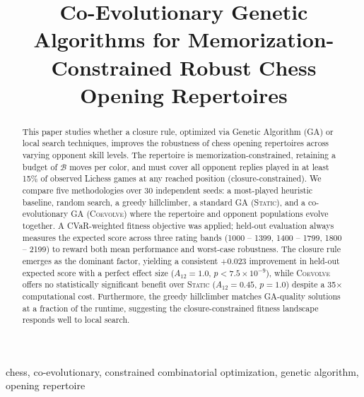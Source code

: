 \documentclass[conference]{IEEEtran}
\begin{document}
\title{Co-Evolutionary Genetic Algorithms for Memorization-Constrained Robust Chess Opening Repertoires}

\author{
}

\maketitle

\begin{abstract}
This paper studies whether a closure rule, optimized via Genetic Algorithm (GA) or local search techniques, improves the robustness of chess opening repertoires across varying opponent skill levels. The repertoire is memorization-constrained, retaining a budget of $\mathcal{B}$ moves per color, and must cover all opponent replies played in at least 15\% of observed Lichess games at any reached position (closure-constrained). We compare five methodologies over 30 independent seeds: a most-played heuristic baseline, random search, a greedy hillclimber, a standard GA (\textsc{Static}), and a co-evolutionary GA (\textsc{Coevolve}) where the repertoire and opponent populations evolve together. A CVaR-weighted fitness objective was applied; held-out evaluation always measures the expected score across three rating bands (1000 -- 1399, 1400 -- 1799, 1800 -- 2199) to reward both mean performance and worst-case robustness. The closure rule emerges as the dominant factor, yielding a consistent $+0.023$ improvement in held-out expected score with a perfect effect size ($A_{12} = 1.0$, $p < 7.5 \times 10^{-9}$), while \textsc{Coevolve} offers no statistically significant benefit over \textsc{Static} ($A_{12}=0.45$, $p=1.0$) despite a 35$\times$ computational cost. Furthermore, the greedy hillclimber matches GA-quality solutions at a fraction of the runtime, suggesting the closure-constrained fitness landscape responds well to local search.
\end{abstract}

\begin{IEEEkeywords}
chess, co-evolutionary, constrained combinatorial optimization, genetic algorithm, opening repertoire
\end{IEEEkeywords}
\end{document}
